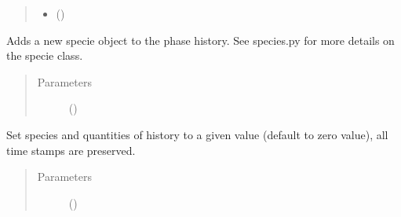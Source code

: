 \documentclass[letterpaper,10pt,openany,oneside,english]{sphinxmanual}
\begin{document}
\begin{fulllineitems}
\begin{fulllineitems}
\begin{quote}
\begin{description}
\begin{itemize}
\item {} 
 () \textendash{} 

\end{itemize}

\end{description}\end{quote}

\end{fulllineitems}


\begin{fulllineitems}
\label{\detokenize{support_rst/phase:phase.Phase.AddSpecie}}
Adds a new specie object to the phase history. See species.py for
more details on the specie class.
\begin{quote}\begin{description}
\item[{Parameters}] \leavevmode
{} () \textendash{} 

\end{description}\end{quote}

\end{fulllineitems}


\begin{fulllineitems}
\label{\detokenize{support_rst/phase:phase.Phase.ClearHistory}}
Set species and quantities of history to a given value
(default to zero value), all time stamps are preserved.
\begin{quote}\begin{description}
\item[{Parameters}] \leavevmode
{} () \textendash{} 

\end{description}\end{quote}


\end{fulllineitems}
\end{fulllineitems}
\end{document}
